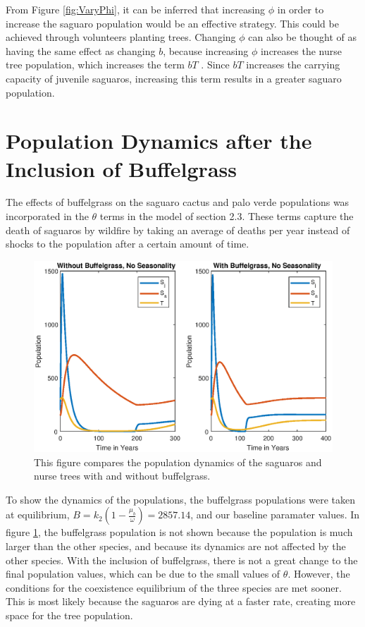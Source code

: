 \documentclass[a4paper]{article}
\begin{document}
From Figure \ref{fig:VaryPhi}, it can be inferred that increasing $\phi$ in order to increase the saguaro population would be an effective strategy. This could be achieved through volunteers planting trees. Changing $\phi$ can also be thought of as having the same effect as changing $b$, because increasing $\phi$ increases the nurse tree population, which increases the term $bT$ . Since $bT$ increases the carrying capacity of juvenile saguaros, increasing this term results in a greater saguaro population.


\section{Population Dynamics after the Inclusion of Buffelgrass}
The effects of buffelgrass on the saguaro cactus and palo verde populations was incorporated in the $\theta$ terms in the model of section 2.3. These terms capture the death of saguaros by wildfire by taking an average of deaths per year instead of shocks to the population after a certain amount of time.
\begin{figure}[H]
\centering
\includegraphics[scale = 0.7]{CompareWithBuffel.eps}
\caption{This figure compares the population dynamics of the saguaros and nurse trees with and without buffelgrass. }
\label{fig:includeBuffel}
\end{figure}
To show the dynamics of the populations, the buffelgrass populations were taken at equilibrium, $B=k_2 \left(1-\displaystyle\frac{\mu_b}{\omega}\right)=2857.14$, and our baseline paramater values. In figure \ref{fig:includeBuffel}, the buffelgrass population is not shown because the population is much larger than the other species, and because its dynamics are not affected by the other species. With the inclusion of buffelgrass, there is not a great change to the final population values, which can be due to the small values of $\theta$. However, the conditions for the coexistence equilibrium of the three species are met sooner. This is most likely because the saguaros are dying at a faster rate, creating more space for the tree population. \\
\end{document}
